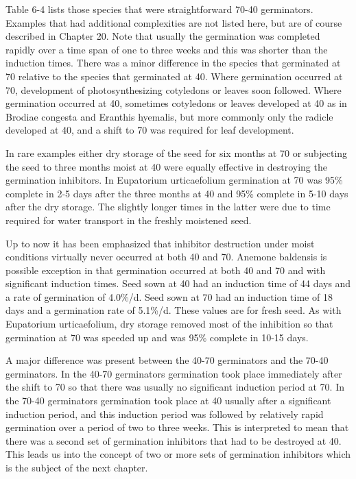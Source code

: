 Table 6-4 lists those species that were straightforward 70-40 germinators.
Examples that had additional complexities are not listed here, but are of course
described in Chapter 20. Note that usually the germination was completed rapidly
over a time span of one to three weeks and this was shorter than the induction times.
There was a minor difference in the species that germinated at 70 relative to the
species that germinated at 40. Where germination occurred at 70, development of
photosynthesizing cotyledons or leaves soon followed. Where germination occurred
at 40, sometimes cotyledons or leaves developed at 40 as in Brodiae congesta and
Eranthis hyemalis, but more commonly only the radicle developed at 40, and a shift to
70 was required for leaf development.

In rare examples either dry storage of the seed for six months at 70 or
subjecting the seed to three months moist at 40 were equally effective in destroying
the germination inhibitors. In Eupatorium urticaefolium germination at 70 was 95\%
complete in 2-5 days after the three months at 40 and 95\% complete in 5-10 days after
the dry storage. The slightly longer times in the latter were due to time required for
water transport in the freshly moistened seed.

Up to now it has been emphasized that inhibitor destruction under moist
conditions virtually never occurred at both 40 and 70. Anemone baldensis is
possible exception in that germination occurred at both 40 and 70 and with significant
induction times. Seed sown at 40 had an induction time of 44 days and a rate of
germination of 4.0\%/d. Seed sown at 70 had an induction time of 18 days and a
germination rate of 5.1\%/d. These values are for fresh seed. As with Eupatorium
urticaefolium, dry storage removed most of the inhibition so that germination at 70 was
speeded up and was 95\% complete in 10-15 days.

A major difference was present between the 40-70 germinators and the 70-40
germinators. In the 40-70 germinators germination took place immediately after the
shift to 70 so that there was usually no significant induction period at 70. In the 70-40
germinators germination took place at 40 usually after a significant induction period,
and this induction period was followed by relatively rapid germination over a period of
two to three weeks. This is interpreted to mean that there was a second set of
germination inhibitors that had to be destroyed at 40. This leads us into the concept of
two or more sets of germination inhibitors which is the subject of the next chapter.

